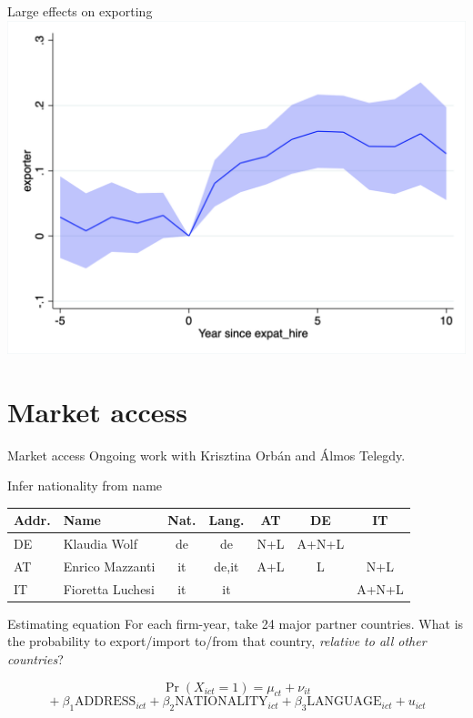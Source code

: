 \documentclass[
  ignorenonframetext,
  aspectratio=43,
]{beamer}
\begin{document}
\begin{frame}{Large effects on exporting}
\protect\hypertarget{large-effects-on-exporting}{}
\includegraphics{figure/event_study/expat_hire_exporter.png}
\end{frame}

\hypertarget{market-access}{%
\section{Market access}\label{market-access}}

\begin{frame}{Market access}
\protect\hypertarget{market-access-1}{}
Ongoing work with Krisztina Orbán and Álmos Telegdy.
\end{frame}

\begin{frame}{Infer nationality from name}
\protect\hypertarget{infer-nationality-from-name}{}
\begin{tabular}{llcc|ccc}
Addr. & Name & Nat. & Lang. & AT & DE & IT\\
\hline
DE & Klaudia Wolf & de & de         & N+L & A+N+L & \\
AT & Enrico Mazzanti & it & de,it   & A+L & L & N+L\\
IT & Fioretta Luchesi & it & it     & & & A+N+L
\end{tabular}
\end{frame}

\begin{frame}{Estimating equation}
\protect\hypertarget{estimating-equation}{}
For each firm-year, take 24 major partner countries. What is the
probability to export/import to/from that country, \emph{relative to all
other countries}?

\[
\Pr(X_{ict}=1) = 
\mu_{ct} + \nu_{it} 
\] \[
{}+ \beta_1 \text{ADDRESS}_{ict} 
{}+ \beta_2 \text{NATIONALITY}_{ict} 
{}+ \beta_3 \text{LANGUAGE}_{ict} 
{}+ u_{ict}
\]
\end{frame}
\end{document}
